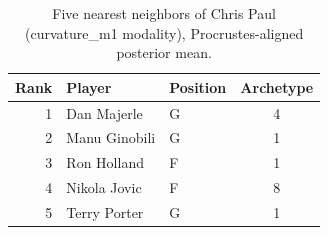 \begin{table}[htbp]
  \centering\small
  \begin{tabular}{rllc}
    \toprule
    Rank & Player & Position & Archetype \\
    \midrule
    1 & Dan Majerle & G & 4 \\
    2 & Manu Ginobili & G & 1 \\
    3 & Ron Holland & F & 1 \\
    4 & Nikola Jovic & F & 8 \\
    5 & Terry Porter & G & 1 \\
    \bottomrule
  \end{tabular}
  \caption{Five nearest neighbors of Chris Paul (curvature_m1 modality), Procrustes-aligned posterior mean.}
  \label{tab:Chris_Paul_neighbors_curvature_m1}
\end{table}

